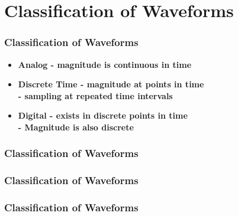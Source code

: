 \documentclass[fleqn]{beamer} %
\newcommand{\sectiontitleIII}{Classification of Waveforms}
\begin{document}
\section{\sectiontitleIII}	
	\begin{frame}[label=sectionIII] \small
		\frametitle{\sectiontitleIII}    

	    \begin{itemize}
			\item \textbf{Analog - magnitude is continuous in time }  \vspace{1mm} \\
			\item \textbf{Discrete Time - magnitude at points in time}  \vspace{1mm} \\
			\textbf{ \hspace*{15mm} - sampling at repeated time intervals}  \vspace{1mm} \\
			\item \textbf{Digital - exists in discrete points in time}  \vspace{1mm} \\
			\textbf{ \hspace*{15mm} - Magnitude is also discrete}  \vspace{1mm} \\
		\end{itemize}
		
		
	\end{frame}

	\begin{frame} \small
		\frametitle{\sectiontitleIII}    



	\end{frame}
	
	\begin{frame} \small
		\frametitle{\sectiontitleIII}    



	\end{frame}
	
	\begin{frame} \small
		\frametitle{\sectiontitleIII}    



	\end{frame}
	
\end{document}
